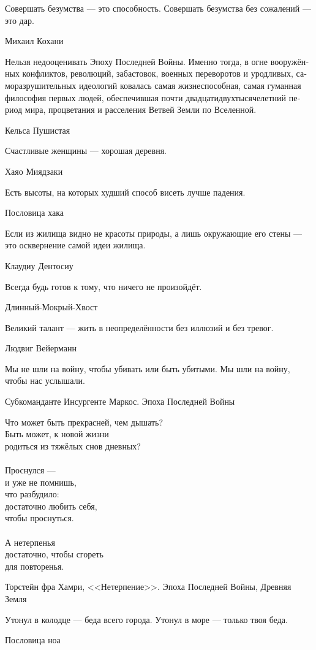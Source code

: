 \documentclass[a4paper,12pt,fleqn]{book}\usepackage{polyglossia}\setdefaultlanguage[babelshorthands=true]{russian}\setotherlanguage{english}\defaultfontfeatures{Ligatures=TeX,Mapping=tex-text}\usepackage{xcolor}\newcommand{\ml}[3]{#2}
\begin{document}
{\epigraph
{Совершать безумства --- это способность.
Совершать безумства без сожалений --- это дар.}
{Михаил Кохани}

\epigraph
{Нельзя недооценивать Эпоху Последней Войны.
Именно тогда, в огне вооружённых конфликтов, революций, забастовок, военных переворотов и уродливых, саморазрушительных идеологий ковалась самая жизнеспособная, самая гуманная философия первых людей, обеспечившая почти двадцатидвухтысячелетний период мира, процветания и расселения Ветвей Земли по Вселенной.}
{Кельса Пушистая}

\epigraph{
\ml{$0$}
{Счастливые женщины --- хорошая деревня.}
{Happy women mean a healthy village.}
}{Хаяо Миядзаки}

\epigraph{
\ml{$0$}
{Есть высоты, на которых худший способ висеть лучше падения.}
{There are some heights, where the worst way to hang on is better than to fall off.}
}{Пословица хака}

\epigraph
{Если из жилища видно не красоты природы, а лишь окружающие его стены --- это осквернение самой идеи жилища.}
{Клаудиу Дентосиу}

\epigraph{
\ml{$0$}
{Всегда будь готов к тому, что ничего не произойдёт.}
{Always expect nothing to happen.}
}{Длинный-Мокрый-Хвост}

\epigraph
{Великий талант --- жить в неопределённости без иллюзий и без тревог.}
{Людвиг Вейерманн}

\epigraph
{Мы не шли на войну, чтобы убивать или быть убитыми.
Мы шли на войну, чтобы нас услышали.}
{Субкоманданте Инсургенте Маркос.
Эпоха Последней Войны}

\epigraph
{Что может быть прекрасней, чем дышать?\\
Быть может, к новой жизни\\
родиться из тяжёлых снов дневных?\\
~\\
Проснулся ---\\
и уже не помнишь,\\
что разбудило:\\
достаточно любить себя,\\
чтобы проснуться.\\
~\\
А нетерпенья\\
достаточно, чтобы сгореть\\
для повторенья.}
{Торстейн фра Хамри, <<Нетерпение>>.
Эпоха Последней Войны, Древняя Земля}

\epigraph
{Утонул в колодце --- беда всего города.
Утонул в море --- только твоя беда.}
{Пословица ноа}

}
\end{document}
